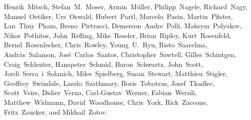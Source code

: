 \begin{FlushLeft}
  Henrik~Mitsch,          %
  Stefan~M.~Moser,        %
  Armin~M\"uller,		%
  Philipp~Nagele,         %
  Richard~Nagy,           %
  Manuel~Oetiker,         %
  Urs~Oswald,             %
  Hubert~Partl,           %
  Marcelo~Pasin,          %
  Martin~Pfister,		%
  Lan~Thuy~Pham,          %
  Breno~Pietracci,        %
  Demerson~Andre~Polli,   %
  Maksym~Polyakov,        %
  Nikos~Pothitos,		%
  John~Refling,           %
  Mike~Ressler,           %
  Brian~Ripley,           %
  Kurt~Rosenfeld,		%
  Bernd~Rosenlecher,      %
  Chris~Rowley,           %
  Young~U.~Ryu,           %
  Risto~Saarelma,         %
  Andr{\'a}s~Salamon,     %
  Jos\'e~Carlos~Santos,   %
  Christopher~Sawtell,    %
  Gilles~Schintgen,       %
  Craig~Schlenter,        %
  Hanspeter~Schmid,       %
  Baron~Schwartz,         %
  John~Scott,             %
  Jordi~Serra~i~Solanich, %
  Miles~Spielberg,        %
  Susan~Stewart,
  Matthieu~Stigler,
  Geoffrey~Swindale,      %
  Laszlo~Szathmary,       %
  Boris~Tobotras,         %
  Josef~Tkadlec,          %
  Scott~Veirs,            %
  Didier~Verna,           %
  Carl-Gustav~Werner,     %
  Fabian~Wernli,          %
  Matthew~Widmann,        %
  David~Woodhouse,        %
  Chris~York,             %
  Rick~Zaccone,           %
  Fritz~Zaucker,          %
  and Mikhail~Zotov.      %
\end{FlushLeft}


\pagebreak
\endinput
%

